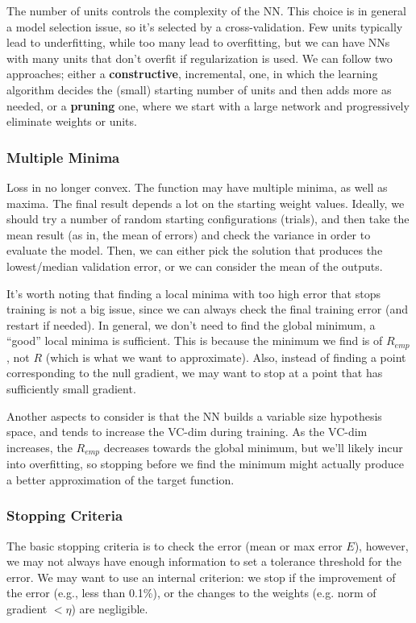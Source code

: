 The number of units controls the complexity of the NN. This choice is in general a model selection issue, so it's selected by a cross-validation. Few units typically lead to underfitting, while too many lead to overfitting, but we can have NNs with many units that don't overfit if regularization is used. We can follow two approaches; either a \textbf{constructive}, incremental, one, in which the learning algorithm decides the (small) starting number of units and then adds more as needed, or a \textbf{pruning} one, where we start with a large network and progressively eliminate weights or units.

\subsubsection{Multiple Minima}

Loss in no longer convex. The function may have multiple minima, as well as maxima. The final result depends a lot on the starting weight values. Ideally, we should try a number of random starting configurations (trials), and then take the mean result (as in, the mean of errors) and check the variance in order to evaluate the model. Then, we can either pick the solution that produces the lowest/median validation error, or we can consider the mean of the outputs.

It's worth noting that finding a local minima with too high error that stops training is not a big issue, since we can always check the final training error (and restart if needed). In general, we don't need to find the global minimum, a ``good'' local minima is sufficient. This is because the minimum we find is of $R_{emp}$, not $R$ (which is what we want to approximate). Also, instead of finding a point corresponding to the null gradient, we may want to stop at a point that has sufficiently small gradient.

Another aspects to consider is that the NN builds a variable size hypothesis space, and tends to increase the VC-dim during training. As the VC-dim increases, the $R_{emp}$ decreases towards the global minimum, but we'll likely incur into overfitting, so stopping before we find the minimum might actually produce a better approximation of the target function.

\subsubsection{Stopping Criteria}

The basic stopping criteria is to check the error (mean or max error $E$), however, we may not always have enough information to set a tolerance threshold for the error. We may want to use an internal criterion: we stop if the improvement of the error (e.g., less than 0.1\%), or the changes to the weights (e.g. norm of gradient $ < \eta$) are negligible.

